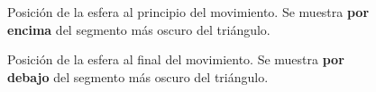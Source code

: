 \documentclass[a4paper,12pt]{article}
\begin{document}
\begin{figure}[h]
    \centering
    \caption{Posición de la esfera al principio del movimiento. Se muestra \textbf{por encima} del segmento más oscuro del triángulo.} \label{estado_1}
\end{figure}
\begin{figure}[h]
    \centering
    \caption{Posición de la esfera al final del movimiento. Se muestra \textbf{por debajo} del segmento más oscuro del triángulo.} \label{estado_2}
\end{figure}
\end{document}
